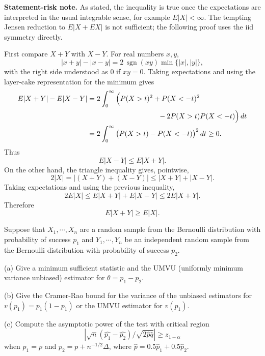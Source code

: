 \begin{solution}
\textbf{Statement-risk note.}
As stated, the inequality is true once the expectations are interpreted in the usual
integrable sense, for example $E|X|<\infty$. The tempting Jensen reduction to
$E|X+E X|$ is not sufficient; the following proof uses the iid symmetry directly.

First compare $X+Y$ with $X-Y$. For real numbers $x,y$,
\[
|x+y|-|x-y|=2\,\operatorname{sgn}(xy)\min\{|x|,|y|\},
\]
with the right side understood as $0$ if $xy=0$. Taking expectations and using the
layer-cake representation for the minimum gives
\[
\begin{aligned}
E|X+Y|-E|X-Y|
&=2\int_0^\infty
\Big(P(X>t)^2+P(X<-t)^2\\
&\hspace{35mm}-2P(X>t)P(X<-t)\Big)\,dt\\
&=2\int_0^\infty \big(P(X>t)-P(X<-t)\big)^2\,dt\geq 0.
\end{aligned}
\]
Thus
\[
E|X-Y|\leq E|X+Y|.
\]
On the other hand, the triangle inequality gives, pointwise,
\[
2|X|=|(X+Y)+(X-Y)|\leq |X+Y|+|X-Y|.
\]
Taking expectations and using the previous inequality,
\[
2E|X|\leq E|X+Y|+E|X-Y|\leq 2E|X+Y|.
\]
Therefore
\[
E|X+Y|\geq E|X|.
\]
\end{solution}

\begin{exercise}
\label{applied:2011:5}
Suppose that $X _ { 1 } , \cdots , X _ { n }$ are a random sample from the Bernoulli distribution with probability of success $p _ { 1 }$ and $Y _ { 1 } , \cdots , Y _ { n }$ be an independent random sample from the Bernoulli distribution with probability of success $p _ { 2 }$.

(a) Give a minimum sufficient statistic and the UMVU (uniformly minimum variance unbiased) estimator for $\theta = p _ { 1 } - p _ { 2 }$.

(b) Give the Cramer-Rao bound for the variance of the unbiased estimators for $v ( p _ { 1 } ) = p _ { 1 } ( 1 - p _ { 1 } )$ or the UMVU estimator for $v ( p _ { 1 } )$.

(c) Compute the asymptotic power of the test with critical region
\[
| \sqrt {n} (\hat {p _ {1}} - \hat {p _ {2}}) / \sqrt {2 \hat {p} \hat {q}} | \geq z _ {1 - \alpha}
\]
when $p _ { 1 } = p$ and $p _ { 2 } = p + n ^ { - 1 / 2 } \Delta$, where $\hat { p } = 0.5 \hat { p } _ { 1 } + 0.5 \hat { p } _ { 2 }$.
\end{exercise}


